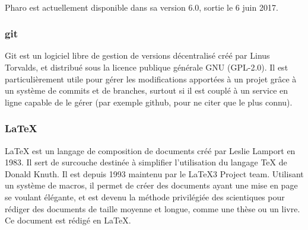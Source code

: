 	\paragraph{}
	Pharo est actuellement disponible dans sa version 6.0, sortie le 6 juin 2017.

	\subsubsection{git}
	Git est un logiciel libre de gestion de versions décentralisé créé par Linus Torvalds, et distribué sous la licence publique générale GNU (GPL-2.0). Il est particulièrement utile pour gérer les modifications apportées à un projet grâce à un système de commits et de branches, surtout si il est couplé à un service en ligne capable de le gérer (par exemple github, pour ne citer que le plus connu).

	\subsubsection{LaTeX}
	LaTeX est un langage de composition de documents créé par Leslie Lamport en 1983. Il sert de surcouche destinée à simplifier l'utilisation du langage TeX de Donald Knuth. Il est depuis 1993 maintenu par le LaTeX3 Project team. Utilisant un système de macros, il permet de créer des documents ayant une mise en page se voulant élégante, et est devenu la méthode privilégiée des scientiques pour rédiger des documents de taille moyenne et longue, comme une thèse ou un livre. Ce document est rédigé en LaTeX.
